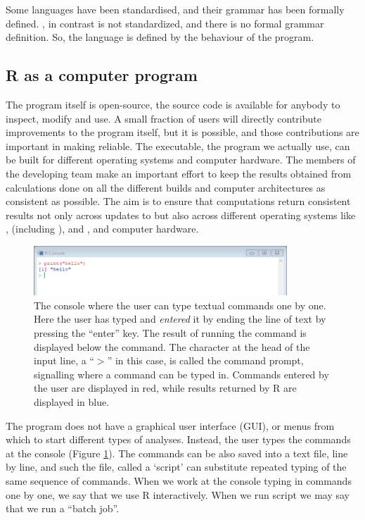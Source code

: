\documentclass[krantz2]{krantz}\usepackage{knitr}%
\begin{document}
\begin{explainbox}
Some languages have been standardised, and their grammar has been formally defined. \Rlang, in contrast is not standardized, and there is no formal grammar definition. So, the \Rlang language is defined by the behaviour of the \Rpgrm program.
\end{explainbox}

\subsection{R as a computer program}
The \Rpgrm program itself is open-source, the source code is available for anybody to inspect, modify and use. A small fraction of users will directly contribute improvements to the \Rpgrm program itself, but it is possible, and those contributions are important in making \Rpgrm reliable. The executable, the \Rpgrm program we actually use, can be built for different operating systems and computer hardware. The members of the \Rpgrm developing team make an important effort to keep the results obtained from calculations done on all the different builds and computer architectures as consistent as possible. The aim is to ensure that computations return consistent results not only across updates to \Rpgrm but also across different operating systems like ,  (including ), and , and computer hardware.

\begin{figure}
  \centering
  \includegraphics[width=0.85\textwidth]{figures/R-console-r}
  \caption[The R console]{The \Rpgrm console where the user can type textual commands one by one. Here the user has typed  and \textit{entered} it by ending the line of text by pressing the ``enter'' key. The result of running the command is displayed below the command. The character at the head of the input line, a ``$>$'' in this case, is called the command prompt, signalling where a command can be typed in. Commands entered by the user are displayed in red, while results returned by R are displayed in blue.}\label{fig:intro:console}
\end{figure}

The \Rpgrm program does not have a graphical user interface (GUI), or menus from which to start different types of analyses. Instead, the user types the commands at the \Rpgrm console (Figure \ref{fig:intro:console}). The commands can be also saved into a text file, line by line, and such the file, called a `script' can substitute repeated typing of the same sequence of commands. When we work at the console typing in commands one by one, we say that we use R interactively. When we run script we may say that we run a ``batch job''.
\end{document}
